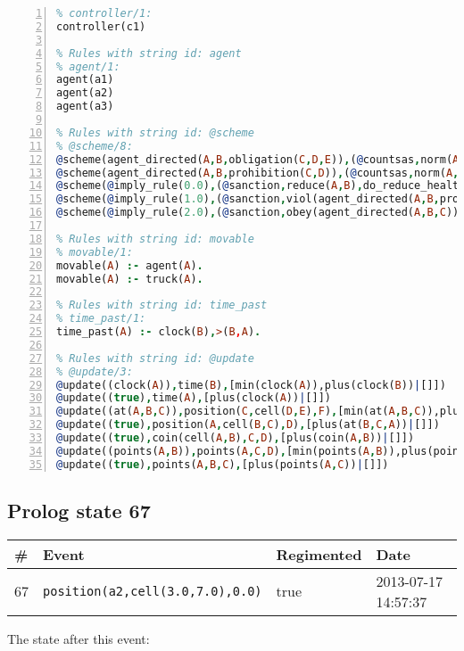 \documentclass[11pt]{article}\usepackage[utf8]{inputenc}\usepackage{geometry}
\begin{document}
\begin{lstlisting}[language=Prolog, numbers=left]
% Rules with string id: controller
% controller/1:
controller(c1)

% Rules with string id: agent
% agent/1:
agent(a1)
agent(a2)
agent(a3)

% Rules with string id: @scheme
% @scheme/8:
@scheme(agent_directed(A,B,obligation(C,D,E)),(@countsas,norm(A,B,F,obligation(C,D,E)),F),false,(listTrue(C)),(time_past(D)),false,[plus(viol(agent_directed(A,B,obligation(C,D,E))))|[]],[plus(obey(agent_directed(A,B,obligation(C,D,E))))|[]])
@scheme(agent_directed(A,B,prohibition(C,D)),(@countsas,norm(A,B,E,prohibition(C,D)),E),(listTrue(C)),false,(false),false,[plus(viol(agent_directed(A,B,prohibition(C,D))))|[]],[plus(obey(agent_directed(A,B,prohibition(C,D))))|[]])
@scheme(@imply_rule(0.0),(@sanction,reduce(A,B),do_reduce_health(A,B),notifyAgent(A,changed(status))),true,false,false,false,[min(reduce(A,B))|[]],[])
@scheme(@imply_rule(1.0),(@sanction,viol(agent_directed(A,B,prohibition(C,D))),do_sanction(D)),true,false,false,false,[min(viol(agent_directed(A,B,prohibition(C,D))))|[]],[])
@scheme(@imply_rule(2.0),(@sanction,obey(agent_directed(A,B,C))),true,false,false,false,[min(obey(agent_directed(A,B,C)))|[]],[])

% Rules with string id: movable
% movable/1:
movable(A) :- agent(A).
movable(A) :- truck(A).

% Rules with string id: time_past
% time_past/1:
time_past(A) :- clock(B),>(B,A).

% Rules with string id: @update
% @update/3:
@update((clock(A)),time(B),[min(clock(A)),plus(clock(B))|[]])
@update((true),time(A),[plus(clock(A))|[]])
@update((at(A,B,C)),position(C,cell(D,E),F),[min(at(A,B,C)),plus(at(D,E,C))|[]])
@update((true),position(A,cell(B,C),D),[plus(at(B,C,A))|[]])
@update((true),coin(cell(A,B),C,D),[plus(coin(A,B))|[]])
@update((points(A,B)),points(A,C,D),[min(points(A,B)),plus(points(A,D))|[]])
@update((true),points(A,B,C),[plus(points(A,C))|[]])

\end{lstlisting}
\clearpage 
\subsection{Prolog state 67}
\begin{table}[ht]
\centering 
\begin{tabular}{l l l l} 
\textbf{\#} & \textbf{Event} & \textbf{Regimented} & \textbf{Date} \\ [0.5ex] 
\hline
67&\texttt{position(a2,cell(3.0,7.0),0.0)}&true&2013-07-17 14:57:37\\ [1ex] \hline\end{tabular}
\end{table}
The state after this event:
\end{document}
